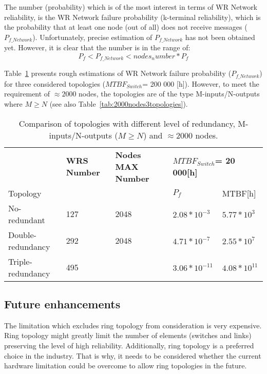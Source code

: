 The number (probability) which is of the most interest in terms of WR Network
reliability, is the WR Network failure probability (k-terminal reliability),
which is the probability that at least one node (out of all) does not receive
messages ($P_{f\_Network}$). Unfortunately, precise estimation of
$P_{f\_Network}$ has not been obtained yet. However, it is clear that the number
is in the range of:
\begin{equation}
       P_f < P_{f\_Network} < nodes_number * P_f
\end{equation}

Table~\ref{tab:2000nodesReliability} presents rough estimations of WR Network
failure probability ($P_{f\_Network}$) for three considered topologies
($MTBF_{Switch}$= 200 000 [h]). However, to meet the requirement of $\approx
2000$ nodes, the topologies are of the type M-inputs/N-outputs where
$M \geq N$ (see also Table~\ref{tab:2000nodes3topologies}).

\begin{table}[ht]
\caption{Comparison of topologies with different level of redundancy,
M-inputs/N-outputs ($M \geq N$) and $\approx 2000$ nodes.}
\centering
\begin{tabular}{|p{4cm}|p{2cm}|p{2cm}|p{2.5cm}|p{2.5cm}|}        \hline
& \textbf{WRS Number} &
\textbf{Nodes MAX Number} &  
\multicolumn{2}{|p{5cm}|}{\textbf{$MTBF_{Switch}$=  20 000[h] }} \\
Topology & & & $P_f$ & MTBF[h]  \\ \hline

No-redundant &  127 &  2048  
& $ 2.08*10^{-3}$  & $ 5.77*10^{3}$
 \\ \hline

Double-redundancy &  292 &  2048  
& $ 4.71*10^{-7}$  &  $ 2.55*10^{7}$
   \\ \hline

Triple-redundancy &  495  &     
& $ 3.06*10^{-11}$  &  $ 4.08*10^{11}$
  \\ \hline
\end{tabular}
\label{tab:2000nodesReliability}
\end{table}

\subsection{Future enhancements}

The limitation which excludes ring topology from consideration is very
expensive. Ring topology might greatly limit the number of elements (switches
and links) preserving the level of high reliability. Additionally, ring topology
is a preferred choice in the industry. That is why, it needs to be considered
whether the current hardware limitation could be overcome to allow ring
topologies in the future.

\vspace{0.25cm}
